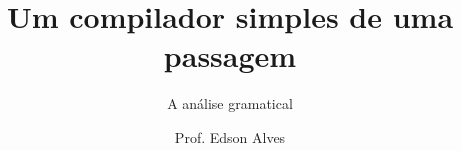 \title{Um compilador simples de uma passagem}
\subtitle{A análise gramatical}
\date{}
\author{Prof. Edson Alves}
